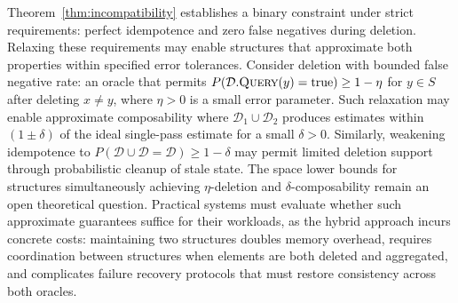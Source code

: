 Theorem~\ref{thm:incompatibility} establishes a binary constraint under strict requirements: perfect idempotence and zero false negatives during deletion. Relaxing these requirements may enable structures that approximate both properties within specified error tolerances. Consider deletion with bounded false negative rate: an oracle that permits $P(\mathcal{D}.\textsc{Query}(y) = \text{true}) \geq 1 - \eta$ for $y \in S$ after deleting $x \neq y$, where $\eta > 0$ is a small error parameter. Such relaxation may enable approximate composability where $\mathcal{D}_1 \cup \mathcal{D}_2$ produces estimates within $(1 \pm \delta)$ of the ideal single-pass estimate for a small $\delta > 0$. Similarly, weakening idempotence to $P(\mathcal{D} \cup \mathcal{D} = \mathcal{D}) \geq 1 - \delta$ may permit limited deletion support through probabilistic cleanup of stale state. The space lower bounds for structures simultaneously achieving $\eta$-deletion and $\delta$-composability remain an open theoretical question. Practical systems must evaluate whether such approximate guarantees suffice for their workloads, as the hybrid approach incurs concrete costs: maintaining two structures doubles memory overhead, requires coordination between structures when elements are both deleted and aggregated, and complicates failure recovery protocols that must restore consistency across both oracles.

